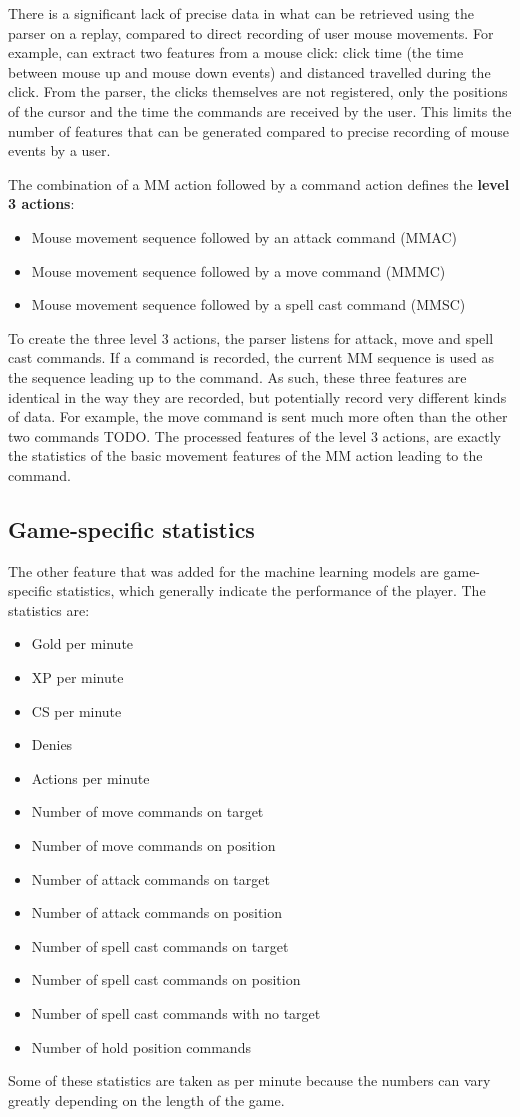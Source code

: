 \documentclass{../sty/SizheArticle}
\begin{document}
There is a significant lack of precise data in what can be retrieved using the parser on a replay, compared to direct recording of user mouse movements. For example, \cite{mouse-dynamics} can extract two features from a mouse click: click time (the time between mouse up and mouse down events) and distanced travelled during the click. From the parser, the clicks themselves are not registered, only the positions of the cursor and the time the commands are received by the user. This limits the number of features that can be generated compared to precise recording of mouse events by a user. 

The combination of a MM action followed by a command action defines the \textbf{level 3 actions}:
\begin{itemize}
\item Mouse movement sequence followed by an attack command (MMAC)
\item Mouse movement sequence followed by a move command (MMMC)
\item Mouse movement sequence followed by a spell cast command (MMSC)
\end{itemize}
To create the three level 3 actions, the parser listens for attack, move and spell cast commands. If a command is recorded, the current MM sequence is used as the sequence leading up to the command. As such, these three features are identical in the way they are recorded, but potentially record very different kinds of data. For example, the move command is sent much more often than the other two commands TODO. The processed features of the level 3 actions, are exactly the statistics of the basic movement features of the MM action leading to the command. 


\subsection{Game-specific statistics}
The other feature that was added for the machine learning models are game-specific statistics, which generally indicate the performance of the player. The statistics are:
\begin{itemize}
\item Gold per minute
\item XP per minute
\item CS per minute
\item Denies
\item Actions per minute
\item Number of move commands on target
\item Number of move commands on position
\item Number of attack commands on target
\item Number of attack commands on position
\item Number of spell cast commands on target
\item Number of spell cast commands on position
\item Number of spell cast commands with no target
\item Number of hold position commands
\end{itemize}
Some of these statistics are taken as per minute because the numbers can vary greatly depending on the length of the game. 
\end{document}
